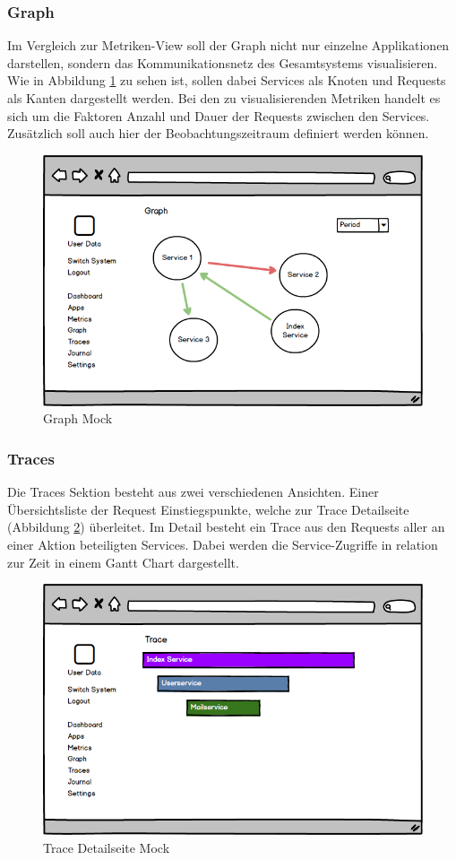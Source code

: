 \subsubsection{Graph}

Im Vergleich zur Metriken-View soll der Graph nicht nur einzelne Applikationen darstellen,
sondern das Kommunikationsnetz des Gesamtsystems visualisieren.
Wie in Abbildung \ref{fig:graph} zu sehen ist, sollen dabei Services als Knoten und Requests als Kanten dargestellt werden.
Bei den zu visualisierenden Metriken handelt es sich um die Faktoren Anzahl und Dauer der Requests zwischen den Services.
Zusätzlich soll auch hier der Beobachtungszeitraum definiert werden können.

\begin{figure}[h]
 \centering
 \includegraphics[width=0.6\linewidth]{kapitel1/mocks/graph.png}
 \caption{Graph Mock}
 \label{fig:graph}
\end{figure}

\subsubsection{Traces}

Die Traces Sektion besteht aus zwei verschiedenen Ansichten. Einer Übersichtsliste der Request Einstiegspunkte,
welche zur Trace Detailseite (Abbildung \ref{fig:trace}) überleitet. Im Detail besteht ein Trace aus den Requests
aller an einer Aktion beteiligten Services. Dabei werden die Service-Zugriffe in relation zur Zeit in einem Gantt Chart dargestellt.

\begin{figure}[h]
 \centering
 \includegraphics[width=0.6\linewidth]{kapitel1/mocks/trace.png}
 \caption{Trace Detailseite Mock}
 \label{fig:trace}
\end{figure}



